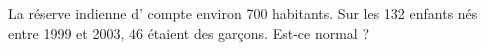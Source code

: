 
\begin{exercice}\label{exosmath-0376}

    La réserve indienne d' compte environ 700 habitants. Sur les 132 enfants nés entre 1999 et 2003, \( 46\)  étaient des garçons. Est-ce normal ?

\end{exercice}
